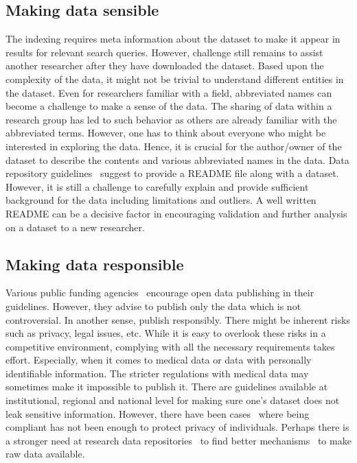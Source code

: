 \documentclass[12pt]{elsarticle}
\begin{document}
\subsection*{Making data sensible}
The indexing requires meta information about the dataset to make it appear in results for relevant search queries. 
However, challenge still remains to assist another researcher after they have downloaded the dataset. 
Based upon the complexity of the data, it might not be trivial to understand different entities in the dataset. 
Even for researchers familiar with a field, abbreviated names can become a challenge to make a sense of the data. 
The sharing of data within a research group has led to such behavior as others are already familiar with the abbreviated terms. 
However, one has to think about everyone who might be interested in exploring the data. 
Hence, it is crucial for the author/owner of the dataset to describe the contents and various abbreviated names in the data. 
Data repository guidelines~\cite{uitGuidelines, openaccessEU} suggest to provide a README file along with a dataset.
However, it is still a challenge to carefully explain and provide sufficient background for the data including limitations and outliers. 
A well written README can be a decisive factor in encouraging validation and further analysis on a dataset to a new researcher. 


\subsection*{Making data responsible}
Various public funding agencies~\cite{openaccessEU, openaccessrcn} encourage open data publishing in their guidelines. 
However, they advise to publish only the data which is not controversial. 
In another sense, publish responsibly. 
There might be inherent risks such as privacy, legal issues, etc. 
While it is easy to overlook these risks in a competitive environment, complying with all the necessary requirements takes effort. 
Especially, when it comes to medical data or data with personally identifiable information. 
The stricter regulations with medical data may sometimes make it impossible to publish it. 
There are guidelines available at institutional, regional and national level for making sure one's dataset does not leak sensitive information. 
However, there have been cases~\cite{zimmer2010but, narayanan2008robust} where being compliant has not been enough to protect privacy of individuals. 
Perhaps there is a stronger need at research data repositories~\cite{nsd, dataverse} to find better mechanisms~\cite{dwork2009differential} to make raw data available. 
\end{document}

